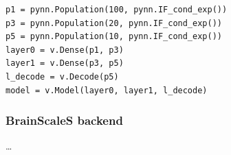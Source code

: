 \begin{lstlisting}[caption={A simple MNIST network in the PyNN backend from the network in figure
    \ref{fig:volr-examples} on page \pageref{fig:volr-examples}. The neuron parameters for the LIF populations have been
omitted.}]
p1 = pynn.Population(100, pynn.IF_cond_exp())
p3 = pynn.Population(20, pynn.IF_cond_exp())
p5 = pynn.Population(10, pynn.IF_cond_exp())
layer0 = v.Dense(p1, p3)
layer1 = v.Dense(p3, p5)
l_decode = v.Decode(p5)
model = v.Model(layer0, layer1, l_decode)
\end{lstlisting}


\subsubsection{BrainScaleS backend} \label{ref:Cairo}
\dots
